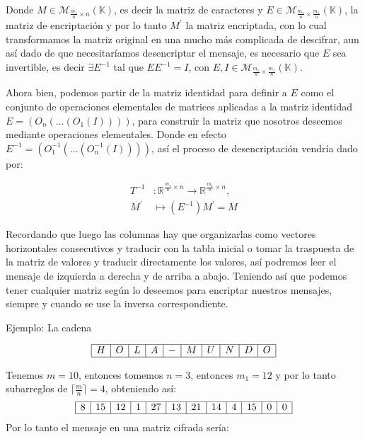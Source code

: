 \documentclass[10pt,a4paper]{article}
\begin{document}
Donde $M \in \mathcal{M}_{\frac{m_{1}}{n} \times n}{(\mathbb{K})}$, es decir la matriz de caracteres y $E \in \mathcal{M}_{\frac{m_{1}}{n} \times \frac{m_{1}}{n}}{(\mathbb{K})}$, la matriz de encriptación y por lo tanto $M^{\prime}$ la matriz encriptada, con lo cual transformamos la matriz original en una mucho más complicada de descifrar, aun así dado de que necesitaríamos desencriptar el mensaje, es necesario que $E$ sea invertible, es decir $\exists E^{-1}$ tal que $EE^{-1}=I$, con $E,I \in \mathcal{M}_{\frac{m_{1}}{n} \times \frac{m_{1}}{n}}{(\mathbb{K})}$. 
 
\vspace{10pt} 

Ahora bien, podemos partir de la matriz identidad para definir a $E$ como el conjunto de operaciones elementales de matrices aplicadas a la matriz identidad $E=(O_{n}(\ldots (O_{1}(I))))$, para construir la matriz que nosotros deseemos mediante operaciones elementales. Donde en efecto $E^{-1}=(O_{1}^{-1}(\ldots (O_{n}^{-1}(I))))$, así el proceso de desencriptación vendría dado por:

\begin{align}
T^{-1} &: \mathbb{R}^{\frac{m_{1}}{n} \times n} \to \mathbb{R}^{\frac{m_{1}}{n} \times n}, \\
  M^{\prime} &\mapsto (E^{-1})M^{\prime}=M
\end{align}

Recordando que luego las columnas hay que organizarlas como vectores horizontales consecutivos y traducir con la tabla inicial o tomar la traspuesta de la matriz de valores y traducir directamente los valores, así podremos leer el mensaje de izquierda a derecha y de arriba a abajo.
Teniendo así que podemos tener cualquier matriz según lo deseemos para encriptar nuestros mensajes, siempre y cuando se use la inversa correspondiente.   
 
\vspace{10pt}  

Ejemplo:
La cadena

\[
\begin{array}{|c|c|c|c|c|c|c|c|c|c|}
\hline
H&O&L&A&-&M&U&N&D&O\\
\hline
\end{array}
\]
 
Tenemos $m=10$, entonces tomemos $n=3$, entonces $m_{1}=12$ y por lo tanto subarreglos de $\lceil\frac{m}{n}\rceil=4$, obteniendo así:
\[
\begin{array}{|c|c|c|c|c|c|c|c|c|c|c|c|}
\hline
8&15&12&1&27&13&21&14&4&15&0&0 \\
\hline
\end{array}
\]
Por lo tanto el mensaje en una matriz cifrada sería:
\end{document}
